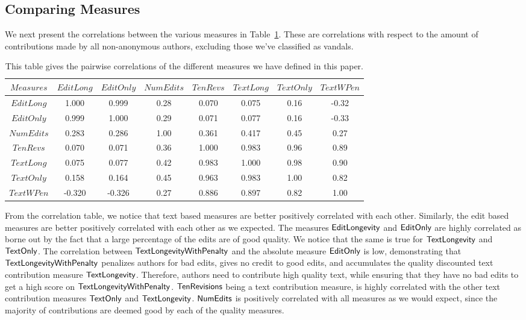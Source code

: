 \pagebreak
\subsection{Comparing Measures}

We next present the correlations between the various measures
in Table~\ref{cor-tab}.
These are correlations with respect to the amount of contributions
made by all non-anonymous authors, excluding those we've classified
as vandals.  
%
\begin{table}
\begin{center}
\begin{tabular}{|c||c|c|c|c|c|c|c|}
	\hline
$Measures$ &  $EditLong$ & $EditOnly$ & $NumEdits$ & $TenRevs$ & $TextLong$ & $TextOnly$ & $TextWPen$ \\
        \hline \hline
$EditLong$         &  1.000  & 0.999  &  0.28  &         0.070  & 0.075  &  0.16  & -0.32 \\
$EditOnly$         &  0.999  & 1.000  &  0.29  &         0.071  & 0.077  &  0.16  & -0.33 \\
$NumEdits$         &  0.283  & 0.286  &  1.00  &         0.361  & 0.417  &  0.45  &  0.27 \\
$TenRevs$          &  0.070  & 0.071  &  0.36  &         1.000  & 0.983  &  0.96  &  0.89 \\
$TextLong$         &  0.075  & 0.077  &  0.42  &         0.983  & 1.000  &  0.98  &  0.90 \\
$TextOnly$         &  0.158  & 0.164  &  0.45  &         0.963  & 0.983  &  1.00  &  0.82 \\
$TextWPen$         & -0.320  &-0.326  &  0.27  &         0.886  & 0.897  &  0.82  &  1.00 \\
        \hline
\end{tabular}
\end{center}
\caption[Correlations of our measures]{
This table gives the pairwise correlations of the different measures we 
have defined in this paper.
}\label{cor-tab}
\end{table}
%
From the correlation table, we notice that text based measures are
better positively correlated with each other.
Similarly, the edit based measures are better positively correlated 
with each other as we expected.
The measures $\mathsf{EditLongevity}$ and $\mathsf{EditOnly}$ are highly correlated as 
borne out by the fact that a large percentage of the edits are of
good quality.
We notice that the same is true for $\mathsf{TextLongevity}$ and $\mathsf{TextOnly}$.
The correlation between $\mathsf{TextLongevityWithPenalty}$ and the absolute measure
$\mathsf{EditOnly}$ is low, demonstrating that $\mathsf{TextLongevityWithPenalty}$
penalizes authors for bad edits, gives no credit to good edits,
and accumulates the quality discounted text contribution measure 
$\mathsf{TextLongevity}$.
Therefore, authors need to contribute high quality text, while
ensuring that they have no bad edits to get a high score on
$\mathsf{TextLongevityWithPenalty}$.
$\mathsf{TenRevisions}$ being a text contribution measure, is highly correlated
with the other text contribution measures $\mathsf{TextOnly}$ and
$\mathsf{TextLongevity}$.
$\mathsf{NumEdits}$ is positively correlated with all measures as we would
expect, since the majority of contributions are deemed good by
each of the quality measures.

